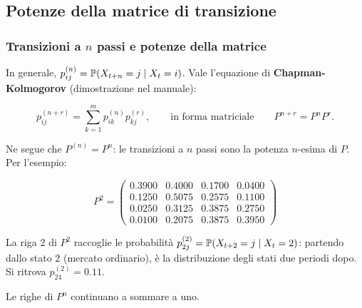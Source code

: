 

\subsection{Potenze della matrice di transizione}%

\begin{frame}%
%

\frametitle{Transizioni a $n$ passi e potenze della matrice}%
%

%


In generale, $p_{ij}^{(n)}=\mathbb{P}(X_{t+n}=j\mid X_{t}=i)$. Vale l'equazione di
\textbf{Chapman-Kolmogorov} (dimostrazione nel manuale):%

\[
p_{ij}^{(n+r)} = \sum_{k=1}^{m} p_{ik}^{(n)}p_{kj}^{(r)}, \qquad\text{in forma
matriciale} \qquad P^{n+r}=P^{n}P^{r}.
\]


Ne segue che $P^{(n)}=P^{n}$: le transizioni a $n$ passi sono la potenza
$n$-esima di $P$. Per l'esempio:%

\[
P^{2} =
\begin{pmatrix}
0.3900 & 0.4000 & 0.1700 & 0.0400\\
0.1250 & 0.5075 & 0.2575 & 0.1100\\
0.0250 & 0.3125 & 0.3875 & 0.2750\\
0.0100 & 0.2075 & 0.3875 & 0.3950
\end{pmatrix}
\]


\begin{stepitemize}
\item La riga $2$ di $P^{2}$ raccoglie le probabilit\`{a} $p_{2j}%
^{(2)}=\Prob(X_{t+2}=j\mid X_{t}=2)$: partendo dallo stato $2$ (mercato
ordinario), \`{e} la distribuzione degli stati due periodi dopo. Si ritrova
$p_{24}^{(2)}=0.11$.

\item Le righe di $P^{n}$ continuano a sommare a uno.
\end{stepitemize}

%

\transboxout
\end{frame}%


